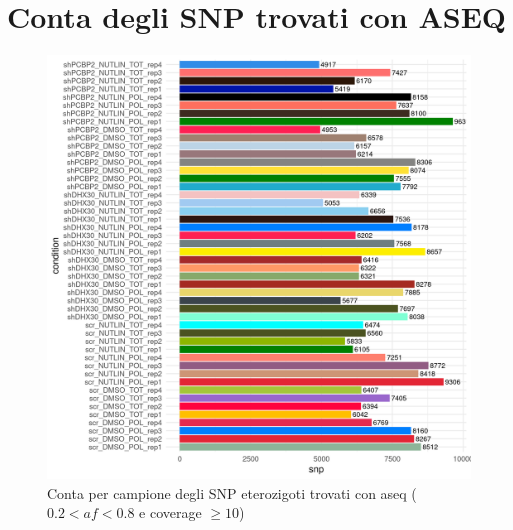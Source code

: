 \section{Conta degli SNP trovati con ASEQ}
\label{sec:snp_count}
 \begin{figure}[H]
   \centering
   \includegraphics[scale=1]{aseq_count_2_8_10_pre.png}
	 \caption{Conta per campione degli SNP eterozigoti trovati con aseq ($0.2< af < 0.8$ e coverage $\ge 10$)}
   \label{fig:}
 \end{figure}

